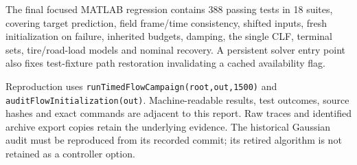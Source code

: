 \documentclass[10pt]{article}
\begin{document}
The final focused MATLAB regression contains 388 passing tests in 18 suites, covering target prediction, field frame/time consistency, shifted inputs, fresh initialization on failure, inherited budgets, damping, the single CLF, terminal sets, tire/road-load models and nominal recovery. A persistent solver entry point also fixes test-fixture path restoration invalidating a cached availability flag.

Reproduction uses \texttt{runTimedFlowCampaign(root,out,1500)} and
\texttt{auditFlowInitialization(out)}. Machine-readable results, test outcomes,
source hashes and exact commands are adjacent to this report. Raw traces and
identified archive export copies retain the underlying evidence. The historical
Gaussian audit must be reproduced from its recorded commit; its retired
algorithm is not retained as a controller option.
\end{document}
